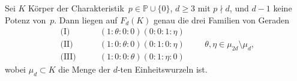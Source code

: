 \begin{fact} \label{fact:regular}
Sei $K$ Körper der Charakteristik~$p \in \mathbb P \cup \{0\}$, $d \geq 3$ mit $p \nmid d$, und $d-1$ keine Potenz von~$p$. Dann liegen auf $F_d(K)$ genau die drei Familien von Geraden
\begin{equation} \label{eq:regular}
\begin{split}
\text{(I)}\qquad	&(1:\theta:0:0)(0:0:1:\eta) \\
\text{(II)}\qquad	&(1:0:\theta:0)(0:1:0:\eta) \\
\text{(III)}\qquad	&(1:0:0:\theta)(0:1:\eta:0)
\end{split} \qquad \theta, \eta \in \mu_{2d} \setminus \mu_d,
\end{equation}
wobei $\mu_d \subset K$ die Menge der $d$-ten Einheitswurzeln ist.
\end{fact}
